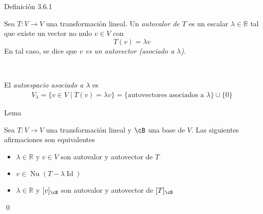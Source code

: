 \documentclass[handout]{beamer} %
\newcommand{\Id}{\operatorname{Id}}
\newcommand{\R}{\mathbb R}
\begin{document}
\begin{frame}

\begin{block}{Definición 3.6.1}

Sea $T:V\longrightarrow V$ una transformación lineal. Un \textit{autovalor de $T$} es un escalar \textit{$\lambda\in\R$} tal que existe un vector no nulo \textit{$v\in V$} con 
$$T(v)=\lambda v$$
En tal caso, se dice que \textit{$v$ es un autovector (asociado a $\lambda$)}.\pause

\

El \textit{autoespacio asociado a $\lambda$} es
\begin{align*}
V_\lambda=\{v\in V\mid T(v)=\lambda v\}=\{\mbox{autovectores asociados a $\lambda$}\}\cup \{0\} 
\end{align*}
\end{block}


\end{frame}



\begin{frame}
	
	\begin{block}{Lema}
		
		Sea $T:V\longrightarrow V$ una transformación lineal y $\cB$ una base de $V$. Las siguientes afirmaciones son equivalentes\pause
		\begin{itemize}
			\item $\lambda\in\R$ y $v\in V$ son autovalor y autovector de $T$\pause
			\item $v\in\operatorname{Nu}(T-\lambda\Id)$\pause
			
			\item $\lambda\in\R$ y $[v]_\cB$ son autovalor y autovector de $[T]_\cB$
		\end{itemize}
	\end{block}\pause
	
	\qed
	
\end{frame}
\end{document}
